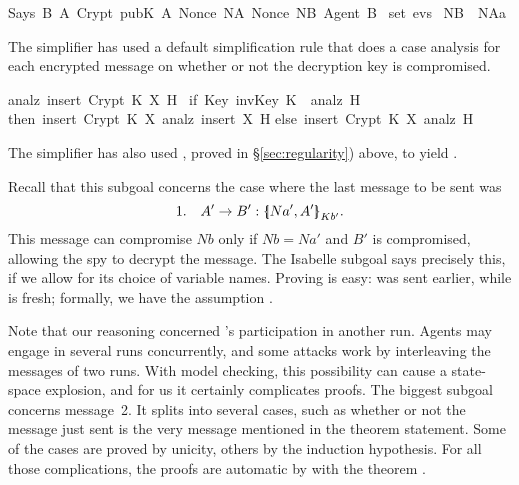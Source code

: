 \begin{isabellebody}
\begin{isamarkuptxt}
\begin{isabelle}
Says\ B\ A\ {\isacharparenleft}Crypt\ {\isacharparenleft}pubK\ A{\isacharparenright}\ {\isasymlbrace}Nonce\ NA{\isacharcomma}\ Nonce\ NB{\isacharcomma}\ Agent\ B{\isasymrbrace}{\isacharparenright}\isanewline
{}\ set\ evs{}\ {\isasymlongrightarrow}\isanewline
{}NB\ {\isasymnoteq}\ NAa%
\end{isabelle}
The simplifier has used a 
default simplification rule that does a case
analysis for each encrypted message on whether or not the decryption key
is compromised.
\begin{isabelle}%
analz\ {\isacharparenleft}insert\ {\isacharparenleft}Crypt\ K\ X{\isacharparenright}\ H{\isacharparenright}\ {\isacharequal}\isanewline
{\isacharparenleft}if\ Key\ {\isacharparenleft}invKey\ K{\isacharparenright}\ {\isasymin}\ analz\ H\isanewline
\isaindent{{\isacharparenleft}}then\ insert\ {\isacharparenleft}Crypt\ K\ X{\isacharparenright}\ {\isacharparenleft}analz\ {\isacharparenleft}insert\ X\ H{\isacharparenright}{\isacharparenright}\isanewline
\isaindent{{\isacharparenleft}}else\ insert\ {\isacharparenleft}Crypt\ K\ X{\isacharparenright}\ {\isacharparenleft}analz\ H{\isacharparenright}{\isacharparenright}%
\end{isabelle}
The simplifier has also used , proved in
{\S}\ref{sec:regularity}) above, to yield .

Recall that this subgoal concerns the case
where the last message to be sent was
\[ 1.\quad  A'\to B'  : \mathopen{\{\kern-.30em|} Na',A'\mathclose{|\kern-.32em\}}\sb{Kb'}. \]
This message can compromise $Nb$ only if $Nb=Na'$ and $B'$ is compromised,
allowing the spy to decrypt the message.  The Isabelle subgoal says
precisely this, if we allow for its choice of variable names.
Proving  is easy:  was
sent earlier, while  is fresh; formally, we have
the assumption . 

Note that our reasoning concerned 's participation in another
run.  Agents may engage in several runs concurrently, and some attacks work
by interleaving the messages of two runs.  With model checking, this
possibility can cause a state-space explosion, and for us it
certainly complicates proofs.  The biggest subgoal concerns message~2.  It
splits into several cases, such as whether or not the message just sent is
the very message mentioned in the theorem statement.
Some of the cases are proved by unicity, others by
the induction hypothesis.  For all those complications, the proofs are
automatic by  with the theorem .


\end{isamarkuptxt}
\end{isabellebody}
